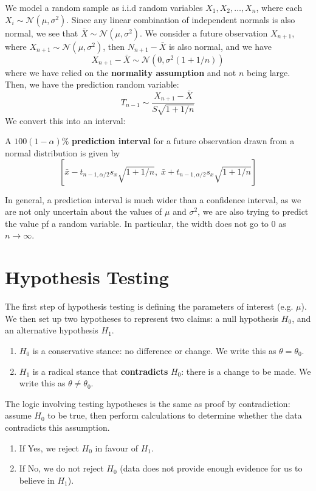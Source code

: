\documentclass{article}
\begin{document}
\noindent We model a random sample as i.i.d random variables $X_{1}, X_{2}, \dots , X_n$, where each $X_i \sim \mathcal{N}(\mu, \sigma^{2})$. Since any linear combination of independent normals is also normal, we see that $\bar{X} \sim \mathcal{N}(\mu, \sigma^{2})$. We consider a future observation $X_{n+1}$, where $X_{n+1} \sim \mathcal{N}(\mu, \sigma^{2})$, then $N_{n+1} - \bar{X}$ is also normal, and we have \begin{equation*}
    X_{n+1} - \bar{X} \sim \mathcal{N}(0, \sigma^{2}(1 + 1 / n))
\end{equation*} where we have relied on the \textbf{normality assumption} and not $n$ being large. Then, we have the prediction random variable: \begin{equation*}
    T_{n-1} \sim \frac{X_{n+1} - \bar{X}}{S \sqrt{1+ 1 / n}}
\end{equation*} We convert this into an interval: \begin{theorem}
    A $100(1-\alpha)\%$ \textbf{prediction interval} for a future observation drawn from a normal distribution is given by \begin{equation*}
        \left[ \bar{x} - t_{n-1, \alpha / 2}s_x \sqrt{1 + 1 / n}, \; \bar{x} + t_{n-1, \alpha / 2}s_x \sqrt{1 + 1 / n}  \right]
    \end{equation*}
\end{theorem} In general, a prediction interval is much wider than a confidence interval, as we are not only uncertain about the values of $\mu$ and $\sigma^{2}$, we are also trying to predict the value pf a random variable. In particular, the width does not go to $0$ as $n \to  \infty$. 

\section{Hypothesis Testing}
The first step of hypothesis testing is defining the parameters of interest (e.g. $\mu$). We then set up two hypotheses to represent two claims: a null hypothesis $H_{0}$, and an alternative hypothesis $H_{1}$. \begin{enumerate}
    \item $H_{0}$ is a conservative stance: no difference or change. We write this as $\theta = \theta_0$.
    \item $H_{1}$ is a radical stance that \textbf{contradicts} $H_{0}$: there is a change to be made. We write this as $\theta \neq \theta_0$. 
\end{enumerate} The logic involving testing hypotheses is the same as proof by contradiction: assume $H_{0}$ to be true, then perform calculations to determine whether the data contradicts this assumption. \begin{enumerate}
    \item If Yes, we reject $H_{0}$ in favour of $H_{1}$. 
    \item If No, we do not reject $H_{0}$ (data does not provide enough evidence for us to believe in $H_{1}$). 
\end{enumerate}
\end{document}
